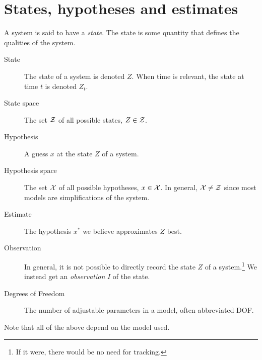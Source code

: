 \section{States, hypotheses and estimates}
A system is said to have a \emph{state}. The state is some quantity
that defines the qualities of the system.

\begin{description}
\item[State] The state of a system is denoted $Z$. When time is
  relevant, the state at time $t$ is denoted $Z_t$.
\item[State space] The set $\mathcal{Z}$ of all possible states, $Z \in \mathcal{Z}$.
\item[Hypothesis] A guess $x$ at the state $Z$ of a system.
\item[Hypothesis space] The set $\mathcal{X}$ of all possible hypotheses, $x
  \in \mathcal{X}$. In general, $\mathcal{X} \neq \mathcal{Z}$ since most models are
  simplifications of the system.
\item[Estimate] The hypothesis $x^*$ we believe approximates $Z$ best.
\item[Observation] In general, it is not possible to directly record
  the state $Z$ of a system.\footnote{If it were, there would be no
    need for tracking.} We instead get an \emph{observation} $I$ of
  the state.
\item[Degrees of Freedom] The number of adjustable parameters in a
  model, often abbreviated DOF.
\end{description}

Note that all of the above depend on the  model used.
